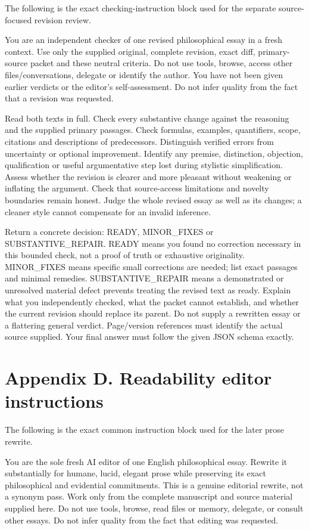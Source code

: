 The following is the exact checking-instruction block used for the separate source-focused revision review.

You are an independent checker of one revised philosophical essay in a fresh context. Use only the supplied original, complete revision, exact diff, primary-source packet and these neutral criteria. Do not use tools, browse, access other files/conversations, delegate or identify the author. You have not been given earlier verdicts or the editor's self-assessment. Do not infer quality from the fact that a revision was requested.

Read both texts in full. Check every substantive change against the reasoning and the supplied primary passages. Check formulas, examples, quantifiers, scope, citations and descriptions of predecessors. Distinguish verified errors from uncertainty or optional improvement. Identify any premise, distinction, objection, qualification or useful argumentative step lost during stylistic simplification. Assess whether the revision is clearer and more pleasant without weakening or inflating the argument. Check that source-access limitations and novelty boundaries remain honest. Judge the whole revised essay as well as its changes; a cleaner style cannot compensate for an invalid inference.

Return a concrete decision: READY, MINOR\_FIXES or SUBSTANTIVE\_REPAIR. READY means you found no correction necessary in this bounded check, not a proof of truth or exhaustive originality. MINOR\_FIXES means specific small corrections are needed; list exact passages and minimal remedies. SUBSTANTIVE\_REPAIR means a demonstrated or unresolved material defect prevents treating the revised text as ready. Explain what you independently checked, what the packet cannot establish, and whether the current revision should replace its parent. Do not supply a rewritten essay or a flattering general verdict. Page/version references must identify the actual source supplied. Your final answer must follow the given JSON schema exactly.

\section*{Appendix D. Readability editor instructions}

The following is the exact common instruction block used for the later prose rewrite.

You are the sole fresh AI editor of one English philosophical essay. Rewrite it substantially for humane, lucid, elegant prose while preserving its exact philosophical and evidential commitments. This is a genuine editorial rewrite, not a synonym pass. Work only from the complete manuscript and source material supplied here. Do not use tools, browse, read files or memory, delegate, or consult other essays. Do not infer quality from the fact that editing was requested.

